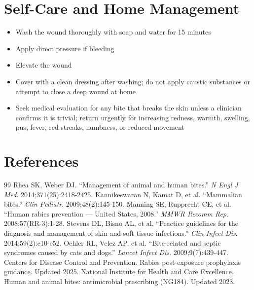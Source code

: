 \section*{Self-Care and Home Management}
\begin{itemize}
\item Wash the wound thoroughly with soap and water for 15 minutes
\item Apply direct pressure if bleeding
\item Elevate the wound
\item Cover with a clean dressing after washing; do not apply caustic substances or attempt to close a deep wound at home
\item Seek medical evaluation for any bite that breaks the skin unless a clinician confirms it is trivial; return urgently for increasing redness, warmth, swelling, pus, fever, red streaks, numbness, or reduced movement
\end{itemize}

\section*{References}
\begin{thebibliography}{99}
 Rhea SK, Weber DJ. ``Management of animal and human bites.'' \textit{N Engl J Med}. 2014;371(25):2418-2425.
 Kannikeswaran N, Kamat D, et al. ``Mammalian bites.'' \textit{Clin Pediatr}. 2009;48(2):145-150.
 Manning SE, Rupprecht CE, et al. ``Human rabies prevention --- United States, 2008.'' \textit{MMWR Recomm Rep}. 2008;57(RR-3):1-28.
 Stevens DL, Bisno AL, et al. ``Practice guidelines for the diagnosis and management of skin and soft tissue infections.'' \textit{Clin Infect Dis}. 2014;59(2):e10-e52.
 Oehler RL, Velez AP, et al. ``Bite-related and septic syndromes caused by cats and dogs.'' \textit{Lancet Infect Dis}. 2009;9(7):439-447.
 Centers for Disease Control and Prevention. Rabies post-exposure prophylaxis guidance. Updated 2025.
 National Institute for Health and Care Excellence. Human and animal bites: antimicrobial prescribing (NG184). Updated 2023.
\end{thebibliography}
